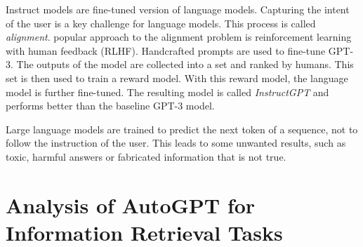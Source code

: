 \documentclass[english, version-2022-01]{uzl-thesis}
\begin{document}
Instruct models are fine-tuned version of language models. Capturing the intent of the user is a key challenge for language models. This process is called \textit{alignment}. popular approach to the alignment problem is reinforcement learning with human feedback (RLHF). Handcrafted prompts are used to fine-tune GPT-3. The outputs of the model are collected into a set and ranked by humans. This set is then used to train a reward model. With this reward model, the language model is further fine-tuned. The resulting model is called \textit{InstructGPT} and performs better than the baseline GPT-3 model.

Large language models are trained to predict the next token of a sequence, not to follow the instruction of the user. This leads to some unwanted results, such as toxic, harmful answers or fabricated information that is not true.





\chapter{Analysis of AutoGPT for Information Retrieval Tasks}

\end{document}
